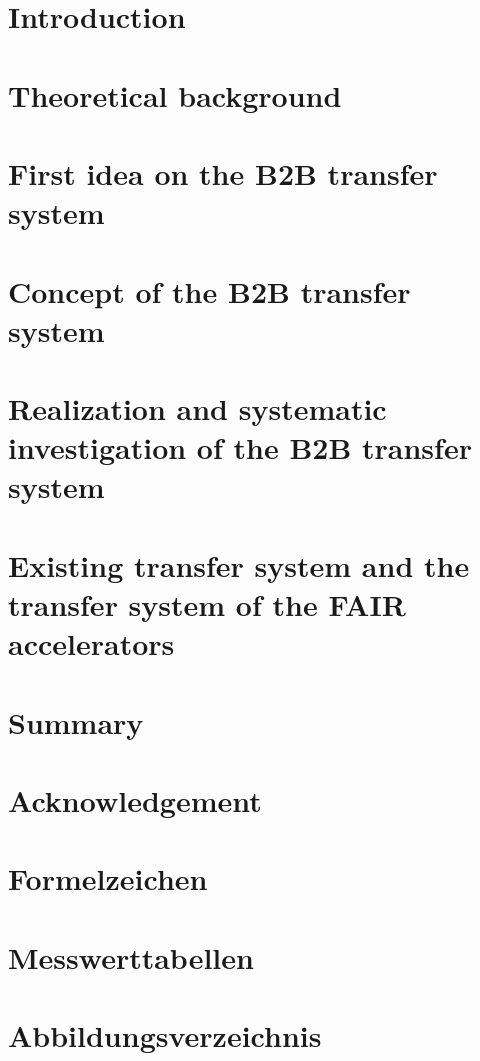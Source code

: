 \documentclass[12pt,twoside]{report}
\begin{document}




\chapter{Introduction}

\chapter{Theoretical background}

\chapter{First idea on the B2B transfer system}

\chapter{Concept of the B2B transfer system}

\chapter{Realization and systematic investigation of the B2B transfer system}

\chapter{Existing transfer system and the transfer system of the FAIR accelerators}

\chapter{Summary}

\chapter{Acknowledgement}


%
\appendix
\chapter{Formelzeichen}

\chapter{Messwerttabellen}

\chapter{Abbildungsverzeichnis}



\end{document}
